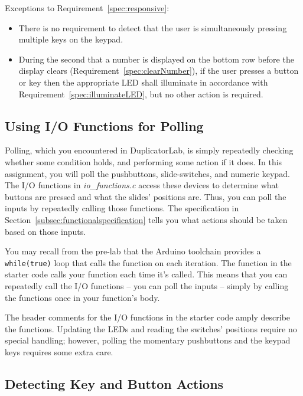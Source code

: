 \begin{enumerate}
        Exceptions to Requirement~\ref{spec:responsive}:
        \begin{itemize}
            \item There is no requirement to detect that the user is simultaneously pressing multiple keys on the keypad.
            \item During the second that a number is displayed on the bottom row before the display clears (Requirement~\ref{spec:clearNumber}), if the user presses a button or key then the appropriate LED shall illuminate in accordance with Requirement~\ref{spec:illuminateLED}, but no other action is required.
        \end{itemize}
\end{enumerate}


\subsection{Using I/O Functions for Polling}

Polling, which you encountered in DuplicatorLab, is simply repeatedly checking whether some condition holds, and performing some action if it does.
In this assignment, you will poll the pushbuttons, slide-switches, and numeric keypad.
The I/O functions in \textit{io\_functions.c} access these devices to determine what buttons are pressed and what the slides' positions are.
Thus, you can poll the inputs by repeatedly calling those functions.
The specification in Section~\ref{subsec:functionalspecification} tells you what actions should be taken based on those inputs.

You may recall from the pre-lab that the Arduino toolchain provides a \lstinline{while(true)} loop that calls the  function on each iteration.
The  function in the starter code calls your  function each time it's called.
This means that you can repeatedly call the I/O functions -- you can poll the inputs -- simply by calling the functions once in your  function's body.

The header comments for the I/O functions in the starter code amply describe the functions.
Updating the LEDs and reading the switches' positions require no special handling;
however, polling the momentary pushbuttons and the keypad keys requires some extra care.

\subsection{Detecting Key and Button Actions}

